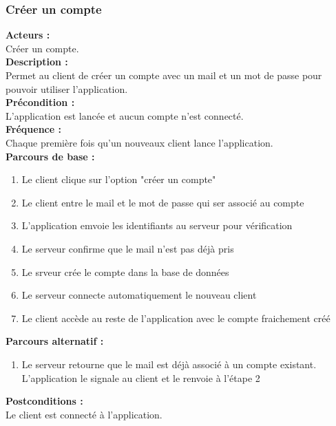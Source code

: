 \documentclass[../rapport.tex]{subfiles}
\begin{document}
\subsubsection{Créer un compte}

\textbf{Acteurs :} \\
Créer un compte. \\

\textbf{Description :} \\
Permet au client de créer un compte avec un mail et un mot de passe pour pouvoir utiliser l’application. \\

\textbf{Précondition :} \\
L’application est lancée et aucun compte n’est connecté. \\

\textbf{Fréquence :} \\
Chaque première fois qu’un nouveaux client lance l’application. \\

\textbf{Parcours de base :} \\
\begin{enumerate}
    \item Le client clique sur l'option "créer un compte"
    \item Le client entre le mail et le mot de passe qui ser associé au compte
    \item L'application emvoie les identifiants au serveur pour vérification
    \item Le serveur confirme que le mail n'est pas déjà pris
    \item Le srveur crée le compte dans la base de données
    \item Le serveur connecte automatiquement le nouveau client
    \item Le client accède au reste de l'application avec le compte fraichement créé
\end{enumerate}
\bigskip

\textbf{Parcours alternatif :}
\begin{enumerate}
    \item Le serveur retourne que le mail est déjà associé à un compte existant. L'application le signale au client et le renvoie à l'étape 2
\end{enumerate}

\textbf{Postconditions :} \\
Le client est connecté à l'application. \\
\end{document}
